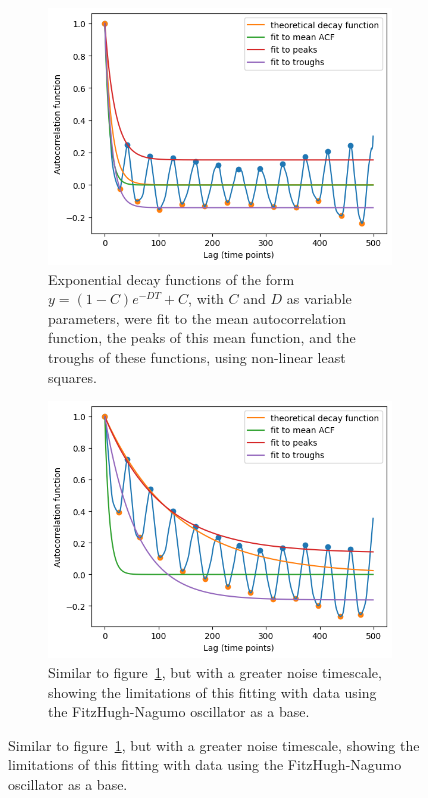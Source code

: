 \begin{figure}
  \centering
  \begin{subfigure}[t]{0.45\textwidth}
  \centering
    \includegraphics[width=\linewidth]{fhn_expofit}
    \caption{
      Exponential decay functions of the form $y = (1-C)e^{-DT}+C$, with $C$ and $D$ as variable parameters, were fit to the mean autocorrelation function, the peaks of this mean function, and the troughs of these functions, using non-linear least squares.
    }
    \label{fig:acf-fhn-noiseparams-fit}
  \end{subfigure}%
  \begin{subfigure}[t]{0.45\textwidth}
  \centering
    \includegraphics[width=\linewidth]{fhn_highnts_expofit}
    \caption{
      Similar to figure~\ref{fig:acf-fhn-noiseparams-fit}, but with a greater noise timescale, showing the limitations of this fitting with data using the FitzHugh-Nagumo oscillator as a base.
    }
    \label{fig:acf-fhn-noiseparams-fit-highnts}
  \end{subfigure}


\end{figure}
